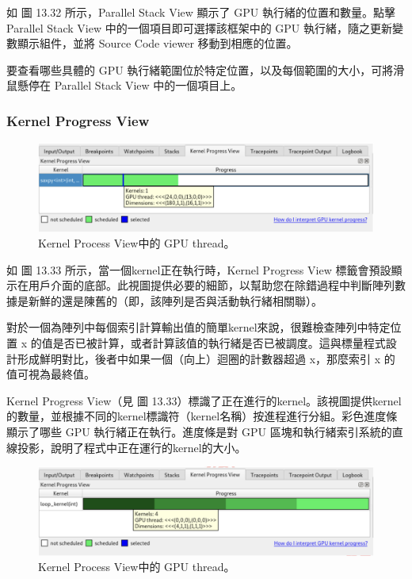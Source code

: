 如 圖 13.32 所示，Parallel Stack View 顯示了 GPU 執行緒的位置和數量。點擊 Parallel Stack View 中的一個項目即可選擇該框架中的 GPU 執行緒，隨之更新變數顯示組件，並將 Source Code viewer 移動到相應的位置。

要查看哪些具體的 GPU 執行緒範圍位於特定位置，以及每個範圍的大小，可將滑鼠懸停在 Parallel Stack View 中的一個項目上。


\subsubsection{Kernel Progress View}

\begin{figure}
    \centering
    \includegraphics[width=0.9\linewidth]{FileAusiliari/Screenshots/Figure13-33.png}
    \caption{Kernel Process View中的 GPU thread。}
    \label{fig:PAPI33}
\end{figure}

如 圖 13.33 所示，當一個kernel正在執行時，Kernel Progress View 標籤會預設顯示在用戶介面的底部。此視圖提供必要的細節，以幫助您在除錯過程中判斷陣列數據是新鮮的還是陳舊的（即，該陣列是否與活動執行緒相關聯）。

對於一個為陣列中每個索引計算輸出值的簡單kernel來說，很難檢查陣列中特定位置 x 的值是否已被計算，或者計算該值的執行緒是否已被調度。這與標量程式設計形成鮮明對比，後者中如果一個（向上）迴圈的計數器超過 x，那麼索引 x 的值可視為最終值。

Kernel Progress View（見 圖 13.33）標識了正在進行的kernel。該視圖提供kernel的數量，並根據不同的kernel標識符（kernel名稱）按進程進行分組。彩色進度條顯示了哪些 GPU 執行緒正在執行。進度條是對 GPU 區塊和執行緒索引系統的直線投影，說明了程式中正在運行的kernel的大小。

\begin{figure}
    \centering
    \includegraphics[width=0.9\linewidth]{FileAusiliari/Screenshots/Figure13-34.png}
    \caption{Kernel Process View中的 GPU thread。}
    \label{fig:PAPI34}
\end{figure}

